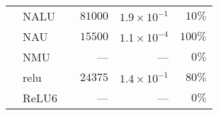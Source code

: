 \begin{table}[H]
\begin{tabular}{lll |rrr}
                       & NALU                       &     & $81000$               & $1.9 \times 10^{-1}$ & $10\%$               \\ 
                       & NAU                        &     & $15500$               & $1.1 \times 10^{-4}$ & $100\%$              \\ 
                       & NMU                        &     & ---                   &     ---               & $0\%$                \\ 
                       & relu                       &     & $24375$               & $1.4 \times 10^{-1}$ & $80\%$               \\ 
                       & ReLU6                      &     & ---                   &     ---               & $0\%$                \\ 
   \hline
\end{tabular}
\end{table}
